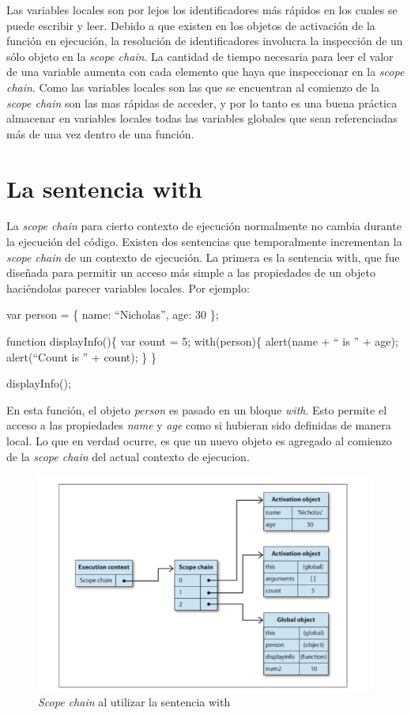 Las variables locales son por lejos los identificadores más rápidos en los cuales se puede escribir y leer. Debido a que existen en los objetos de activación de la función
en ejecución, la resolución de identificadores involucra la inspección de un sólo objeto en la \emph{scope chain}. La cantidad de tiempo necesaria para leer el valor de una
variable aumenta con cada elemento que haya que inspeccionar en la \emph{scope chain}. Como las variables locales son las que se encuentran al comienzo de la \emph{scope chain}
son las mas rápidas de acceder, y por lo tanto es una buena práctica almacenar en variables locales todas las variables globales que sean referenciadas más de una vez
dentro de una función.

\section{La sentencia with}
La \emph{scope chain} para cierto contexto de ejecución normalmente no cambia durante la ejecución del código. Existen dos sentencias que temporalmente incrementan la
\emph{scope chain} de un contexto de ejecución. La primera es la sentencia with, que fue diseñada para permitir un acceso más simple a las propiedades de un objeto haciéndolas
parecer variables locales. Por ejemplo:

\begin{em}
var person = \{
    name: ``Nicholas'',
    age: 30
\};

function displayInfo()\{
    var count = 5;
    with(person)\{
        alert(name + `` is '' + age);
        alert(``Count is '' + count);
    \}
\}

displayInfo();
\end{em}

En esta función, el objeto \emph{person} es pasado en un bloque \emph{with}. Esto permite el acceso a las propiedades \emph{name} y \emph{age} como si hubieran sido definidas
de manera local. Lo que en verdad ocurre, es que un nuevo objeto es agregado al comienzo de la \emph{scope chain} del actual contexto de ejecucion.

\begin{figure}[h]
\centering
\includegraphics[width=1\textwidth]{figuras/scope_chain_with_statement.png}
	\caption{\emph{Scope chain} al utilizar la sentencia with}
    \label{fig.scope_chain_with_statement}
\end{figure}

